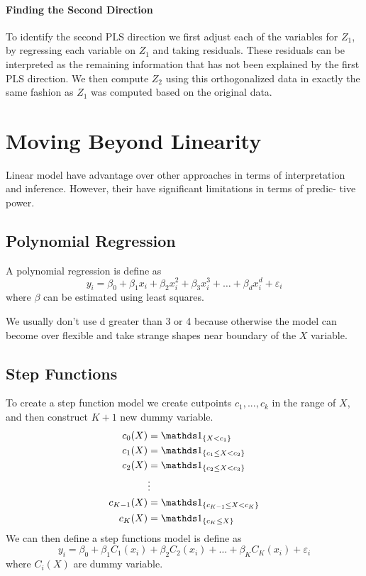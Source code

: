 \paragraph{Finding the Second Direction} To identify the second PLS direction we first adjust each of the variables for $Z_1$, by regressing each variable on $Z_1$ and taking residuals. These residuals can be interpreted as the remaining information that has not been explained by the first PLS direction. We then compute $Z_2$ using this orthogonalized data in exactly the same fashion as $Z_1$ was computed based on the original data.

\section{Moving Beyond Linearity}
Linear model have advantage over other approaches in terms of interpretation and inference. However, their have significant limitations in terms of predic- tive power.

\subsection{Polynomial Regression}
A polynomial regression is define as
\[ y_{i}=\beta_{0}+\beta_{1} x_{i}+\beta_{2} x_{i}^{2}+\beta_{3} x_{i}^{3}+\ldots+\beta_{d} x_{i}^{d}+\varepsilon_{i} \]
where $\beta$ can be estimated using least squares. 
\begin{note}
    We usually don't use d greater than 3 or 4 because otherwise the model can become over flexible and take strange shapes near boundary of the $X$ variable.
\end{note}

\subsection{Step Functions}
To create a step function model we create cutpoints $c_1,...,c_k$ in the range of $X$, and then construct $K+1$ new dummy variable.
\begin{align*}
    c_0(X) &= \indic{X < c_1} \\
    c_1(X) &= \indic{c_1 \leq X < c_2} \\
    c_2(X) &= \indic{c_2 \leq X < c_3} \\
    &\vdots \\
    c_{K-1}(X) &= \indic{c_{K-1} \leq X < c_K} \\
    c_K(X) &= \indic{c_K \leq X}  
\end{align*}
We can then define a step functions model is define as
\[ y_{i}=\beta_{0}+\beta_{1} C_{1}\left(x_{i}\right)+\beta_{2} C_{2}\left(x_{i}\right)+\ldots+\beta_{K} C_{K}\left(x_{i}\right)+\varepsilon_{i} \]
where $C_i(X)$ are dummy variable.

